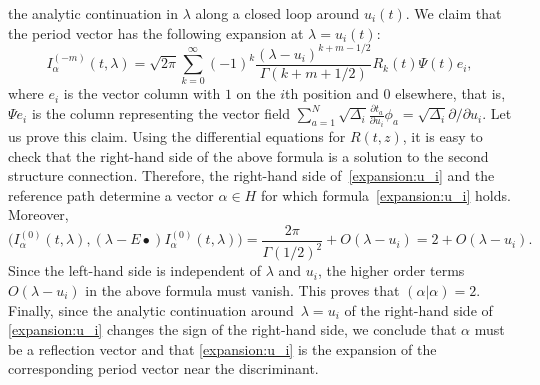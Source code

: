 \documentclass[10pt,a4paper]{article}
\numberwithin{equation}{section}
\begin{document}
the analytic continuation in $\lambda$ along a closed loop around
$u_i(t)$. We claim that the period vector has the following expansion
at $\lambda=u_i(t)$:
\begin{equation}\label{expansion:u_i}
I^{(-m)}_\alpha(t,\lambda)=\sqrt{2\pi }
\sum_{k=0}^\infty (-1)^k
\frac{(\lambda-u_i)^{k+m-1/2}}{\Gamma(k+m+1/2)}
R_k(t) \Psi(t) e_i,
\end{equation}
where $e_i$ is the vector column with $1$ on the $i$th position and $0$
elsewhere, that is, $\Psi e_i$ is the column representing the vector field
$\sum_{a=1}^N \sqrt{\Delta_i} \frac{\partial t_a}{\partial u_i}
\phi_a = \sqrt{\Delta_i}\partial/\partial u_i$. Let us prove this
claim. Using the differential
equations for $R(t,z)$, it is easy to check that the right-hand side of the above
formula is a solution to the second structure connection. Therefore, the
right-hand side of~\eqref{expansion:u_i} and the reference path determine a vector
$\alpha\in H$ for which formula~\eqref{expansion:u_i} holds. Moreover,
\[
\big(I^{(0)}_\alpha(t,\lambda),(\lambda-E\bullet)
I^{(0)}_\alpha(t,\lambda)\big) =
\frac{2\pi}{\Gamma(1/2)^2} +O(\lambda-u_i)=
2+O(\lambda-u_i).
\]
Since the left-hand side is independent of $\lambda$ and $u_i$, the higher order
terms $O(\lambda-u_i)$ in the above formula must vanish. This proves
that $(\alpha|\alpha)=2$. Finally, since the analytic continuation around~$\lambda=u_i$ of the right-hand side of \eqref{expansion:u_i} changes the sign of
the right-hand side, we conclude that $\alpha$ must be a reflection vector and
that \eqref{expansion:u_i} is the expansion of the corresponding
period vector near the discriminant.
\end{document}
